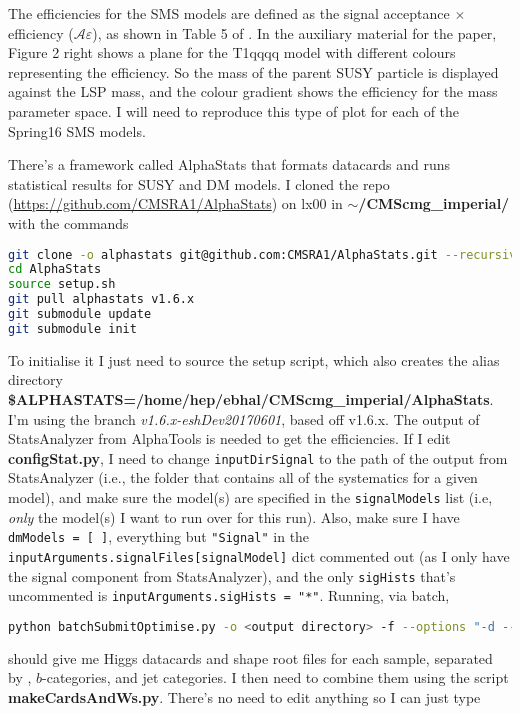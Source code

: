The efficiencies for the SMS models are defined as the signal acceptance $\times$ efficiency ($\mathcal{A} \varepsilon$), as shown in Table 5 of \cite{CMS-PAPER-SUS-15-005-arXiv}. In the auxiliary material for the paper, Figure 2 right shows a plane for the T1qqqq model with different colours representing the efficiency. So the mass of the parent SUSY particle is displayed against the LSP mass, and the colour gradient shows the efficiency for the mass parameter space. I will need to reproduce this type of plot for each of the Spring16 SMS models.

There's a framework called AlphaStats that formats datacards and runs statistical results for SUSY and DM models. I cloned the repo (\url{https://github.com/CMSRA1/AlphaStats}) on lx00 in \textbf{$\sim$/CMScmg\_imperial/} with the commands

\begin{lstlisting}[belowskip=-0.7cm, language=sh, numbers=none]
git clone -o alphastats git@github.com:CMSRA1/AlphaStats.git --recursive
cd AlphaStats
source setup.sh 
git pull alphastats v1.6.x
git submodule update
git submodule init
\end{lstlisting}

To initialise it I just need to source the setup script, which also creates the alias directory \textbf{\$ALPHASTATS=/home/hep/ebhal/CMScmg\_imperial/AlphaStats}. I'm using the branch \emph{v1.6.x-eshDev20170601}, based off v1.6.x. The output of StatsAnalyzer from AlphaTools is needed to get the efficiencies. If I edit \textbf{configStat.py}, I need to change \verb!inputDirSignal! to the path of the output from StatsAnalyzer (i.e., the folder that contains all of the systematics for a given model), and make sure the model(s) are specified in the \verb!signalModels! list (i.e, \emph{only} the model(s) I want to run over for this run). Also, make sure I have \texttt{dmModels = [ ]}, everything but \verb!"Signal"! in the \texttt{inputArguments.signalFiles[signalModel]} dict commented out (as I only have the signal component from StatsAnalyzer), and the only \texttt{sigHists} that's uncommented is \texttt{inputArguments.sigHists = "*"}. Running, via batch,

\begin{lstlisting}[belowskip=-0.7cm, language=sh, numbers=none]
python batchSubmitOptimise.py -o <output directory> -f --options "-d --getDataLumi --greenBand --signalMCStat" --submit
\end{lstlisting}

should give me Higgs datacards and shape root files for each sample, separated by \HT, $b$-categories, and jet categories. I then need to combine them using the script \textbf{makeCardsAndWs.py}. There's no need to edit anything so I can just type

